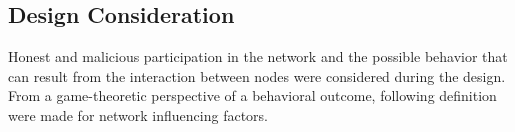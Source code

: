 %

\subsection{Design Consideration}
Honest and malicious participation in the network and the possible behavior
that can result from the interaction between nodes were considered during the
design. From a game-theoretic perspective of a behavioral outcome, following
definition were made for network influencing factors. 

